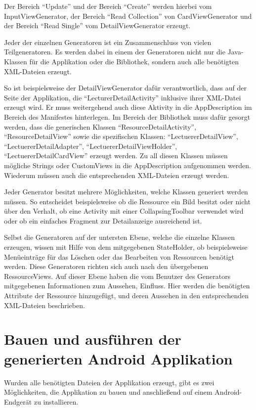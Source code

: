 Der Bereich \enquote{Update} und der Bereich \enquote{Create} werden hierbei vom InputViewGenerator, der Bereich \enquote{Read Collection} von CardViewGenerator und der Bereich \enquote{Read Single} vom DetailViewGenerator erzeugt.

Jeder der einzelnen Generatoren ist ein Zusammenschluss von vielen Teilgeneratoren. Es werden dabei in einem der Generatoren nicht nur die Java-Klassen für die Applikation oder die Bibliothek, sondern auch alle benötigten XML-Dateien erzeugt.

So ist beispielsweise der DetailViewGenerator dafür verantwortlich, dass auf der Seite der Applikation, die \enquote{LecturerDetailActivity} inklusive ihrer XML-Datei erzeugt wird. Er muss weitergehend auch diese Aktivity in die AppDescription im Bereich des Manifestes hinterlegen. Im Bereich der Bibliothek muss dafür gesorgt werden, dass die generischen Klassen \enquote{ResourceDetailActivity}, \enquote{ResourceDetailView} sowie die spezifischen Klassen: \enquote{LectuererDetailView}, \enquote{LectuererDetailAdapter}, \enquote{LectuererDetailViewHolder}, \enquote{LectuererDetailCardView} erzeugt werden. Zu all diesen Klassen müssen mögliche Strings oder CustomViews in die AppDescription aufgenommen werden. Wiederum müssen auch die entsprechenden XML-Dateien erzeugt werden. 

Jeder Generator besitzt mehrere Möglichkeiten, welche Klassen generiert werden müssen. So entscheidet beispielsweise ob die Ressource ein Bild besitzt oder nicht über den Verhalt, ob eine Activity mit einer CollapsingToolbar verwendet wird oder ob ein einfaches Fragment zur Detailanzeige ausreichend ist.

Selbst die Generatoren auf der untersten Ebene, welche die einzelne Klassen erzeugen, wissen mit Hilfe von dem mitgegebenen StateHolder, ob beispielsweise Menüeinträge für das Löschen oder das Bearbeiten von Ressourcen benötigt werden. Diese Generatoren richten sich auch nach den übergebenen RessourceViews. Auf dieser Ebene haben die vom Benutzer des Generators mitgegebenen Informationen zum Aussehen, Einfluss. Hier werden die benötigten Attribute der Ressource hinzugefügt, und deren Aussehen in den entsprechenden XML-Dateien beschrieben.


\section{Bauen und ausführen der generierten Android Applikation}

Wurden alle benötigten Dateien der Applikation erzeugt, gibt es zwei Möglichkeiten, die Applikation zu bauen und anschließend auf einem Android-Endgerät zu installieren.


